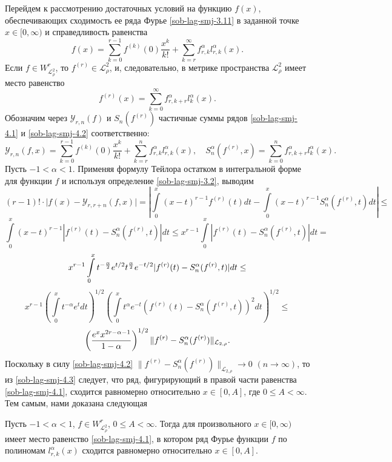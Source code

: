      Перейдем к рассмотрению достаточных условий на функцию $f(x)$,
     обеспечивающих сходимость ее  ряда Фурье \eqref{sob-lag-smj-3.11} в заданной точке $x\in[0,\infty)$ и справедливость равенства
\begin{equation}\label{sob-lag-smj-4.1}
f(x)= \sum_{k=0}^{r-1} f^{(k)}(0)\frac{x^k}{k!}+ \sum_{k=r}^\infty f_{r,k}^\alpha l_{r,k}^\alpha(x).
\end{equation}
Если $f\in W^r_{\mathcal{L}_{\rho}^2}$, то $f^{(r)}\in\mathcal{L}_{\rho}^2$,
и, следовательно, в метрике пространства $\mathcal{L}_{\rho}^2$ имеет
     место равенство
\begin{equation}\label{sob-lag-smj-4.2}
f^{(r)}(x)=\sum_{k=0}^\infty f_{r,k+r}^\alpha l_k^\alpha(x).
\end{equation}
Обозначим через $\mathcal{Y}_{r,n}(f)$ и $S_n(f^{(r)})$ частичные суммы рядов \eqref{sob-lag-smj-4.1} и \eqref{sob-lag-smj-4.2} соответственно:
\begin{equation*}
\mathcal{Y}_{r,n}(f,x)=\sum_{k=0}^{r-1} f^{(k)}(0)\frac{x^k}{k!}+ \sum_{k=r}^{n} f_{r,k}^\alpha l_{r,k}^\alpha(x), \quad
S_{n}^\alpha(f^{(r)},x)=
\sum_{k=0}^n f_{r,k+r}^\alpha l_k^\alpha(x).
\end{equation*}
Пусть $-1<\alpha<1$. Применяя формулу Тейлора остатком в интегральной форме для функции $f$ и используя определение \eqref{sob-lag-smj-3.2}, выводим
$$
(r-1)! \cdot \bigl|f(x) - \mathcal{Y}_{r,r+n}(f,x)\bigr| =\left|\int\limits_0^x(x-t)^{r-1}f^{(r)}(t)dt-
\int\limits_0^x(x-t)^{r-1}S_{n}^\alpha(f^{(r)},t)dt\right|\le
$$
$$
\int\limits_0^x(x-t)^{r-1}|f^{(r)}(t)-
S_{n}^\alpha(f^{(r)},t)|dt \le
x^{r-1}\int\limits_0^x|f^{(r)}(t)-S_{n}^\alpha(f^{(r)},t)|dt=
$$
$$
x^{r-1}\int\limits_0^xt^{-{\alpha\over2}}e^{t/2}
t^{{\alpha\over2}}e^{-t/2}
       |f^{(r)}(t)-S_{n}^\alpha(f^{(r)},t)|dt\le
$$
$$
x^{r-1}\left(\int\limits_0^xt^{-\alpha}e^tdt\right)^{1/2}
     \left(\int\limits_0^x
t^\alpha e^{-t}(f^{(r)}(t)-S_{n}^\alpha(f^{(r)},t))^2dt\right)^{1/2}\le
$$
\begin{equation}\label{sob-lag-smj-4.3}
\left({e^xx^{2r-\alpha-1}\over 1-\alpha}\right)^{1/2}
\|f^{(r)}-S_{n}^\alpha(f^{(r)})\|_{\mathcal{L}_{2,\rho}}.
\end{equation}
Поскольку в силу \eqref{sob-lag-smj-4.2} $\|f^{(r)}-S_{n}^\alpha(f^{(r)})\|_{\mathcal{L}_{2,\rho}}\to0$ $(n\to\infty)$, то из \eqref{sob-lag-smj-4.3} следует, что ряд, фигурирующий в правой части равенства \eqref{sob-lag-smj-4.1}, сходится равномерно относительно $x\in[0,A]$, где $0\le A<\infty$. Тем самым, нами доказана следующая
\begin{theorem}\label{sob-lag-smj-fourier-laguerre}
Пусть $-1<\alpha<1$, $f\in W^r_{\mathcal{L}_{\rho}^2}$, $0\le A<\infty$. Тогда для произвольного $x\in[0,\infty)$ имеет место равенство \eqref{sob-lag-smj-4.1}, в котором ряд Фурье функции $f$ по полиномам $l_{r,k}^\alpha(x)$ сходится равномерно относительно $x\in[0,A]$.
\end{theorem}

